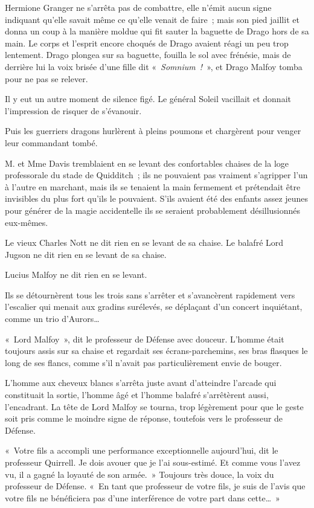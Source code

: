 Hermione Granger ne s'arrêta pas de combattre, elle n'émit aucun signe indiquant qu'elle savait même ce qu'elle venait de faire~; mais son pied jaillit et donna un coup à la manière moldue qui fit sauter la baguette de Drago hors de sa main.
Le corps et l'esprit encore choqués de Drago avaient réagi un peu trop lentement.
Drago plongea sur sa baguette, fouilla le sol avec frénésie, mais de derrière lui la voix brisée d'une fille dit «~\emph{Somnium~!}~», et Drago Malfoy tomba pour ne pas se relever.

Il y eut un autre moment de silence figé.
Le général Soleil vacillait et donnait l'impression de risquer de s'évanouir.

Puis les guerriers dragons hurlèrent à pleins poumons et chargèrent pour venger leur commandant tombé.

\later

M. et Mme Davis tremblaient en se levant des confortables chaises de la loge professorale du stade de Quidditch~; ils ne pouvaient pas vraiment s'agripper l'un à l'autre en marchant, mais ils se tenaient la main fermement et prétendait être invisibles du plus fort qu'ils le pouvaient.
S'ils avaient été des enfants assez jeunes pour générer de la magie accidentelle ils se seraient probablement désillusionnés eux-mêmes.

Le vieux Charles Nott ne dit rien en se levant de sa chaise.
Le balafré Lord Jugson ne dit rien en se levant de sa chaise.

Lucius Malfoy ne dit rien en se levant.

Ils se détournèrent tous les trois sans s'arrêter et s'avancèrent rapidement vers l'escalier qui menait aux gradins surélevés, se déplaçant d'un concert inquiétant, comme un trio d'Aurors…

«~Lord Malfoy~», dit le professeur de Défense avec douceur.
L'homme était toujours assis sur sa chaise et regardait ses écrans-parchemins, ses bras flasques le long de ses flancs, comme s'il n'avait pas particulièrement envie de bouger.

L'homme aux cheveux blancs s'arrêta juste avant d'atteindre l'arcade qui constituait la sortie, l'homme âgé et l'homme balafré s'arrêtèrent aussi, l'encadrant.
La tête de Lord Malfoy se tourna, trop légèrement pour que le geste soit pris comme le moindre signe de réponse, toutefois vers le professeur de Défense.

«~Votre fils a accompli une performance exceptionnelle aujourd'hui, dit le professeur Quirrell.
Je dois avouer que je l'ai sous-estimé.
Et comme vous l'avez vu, il a gagné la loyauté de son armée.~»
Toujours très douce, la voix du professeur de Défense.
«~En tant que professeur de votre fils, je suis de l'avis que votre fils ne bénéficiera pas d'une interférence de votre part dans cette…~»

